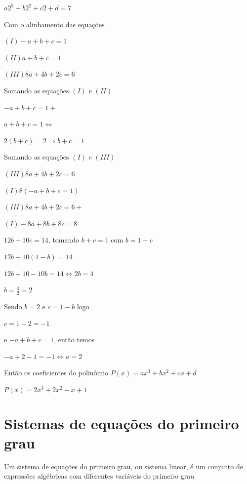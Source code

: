 \begin{multicols*}{2}
\begin{enumerate}
\begin{enumerate}
            $a2^3 + b2^2 + c2 + d = 7$
    
            Com o alinhamento das equações		
            
            $(I) -a +b +c = 1$
            
            $(II) a+b+c = 1$
            
            $(III) 8a + 4b + 2c = 6$
            
            Somando as equações $(I)$ e $(II)$
            
            $-a +b +c = 1 +$
            
            $a +b+ c = 1 \Leftrightarrow$
            
            $2(b+c) = 2 \Rightarrow b+c = 1$
            
            Somando as equações $(I)$ e $(III)$
            
            $(III) 8a +4b + 2c = 6$
                    
            $(I) 8(-a+b+c = 1)$
                    
            $(III) 8a +4b + 2c = 6 +$
                    
            $(I) -8a+8b+8c = 8$
            
            $12b + 10c = 14$, tomando $b+c =1$ com $b = 1 - c$
            
            $12b +10(1-b) = 14$
            
            $12b +10 -10b = 14 \Leftrightarrow 2b = 4$
            
            $b = \frac{4}{2} = 2$
            
            Sendo $b = 2$ e $c = 1 - b$ logo
            
            $c = 1 - 2 = -1$
            
            e $-a+b+c = 1$, então temos
            
            $-a +2 - 1 = -1 \Leftrightarrow a = 2$
            
            Então os coeficientes do polinômio $P(x) = ax^3 + bx^2 + cx + d$ 
            
            $P(x) = 2x^3 +2x^2 -x +1$
            \end{enumerate}
            \end{enumerate}	 
                
             \section*{Sistemas de equações do primeiro grau}
             Um sistema de equações do primeiro grau, ou sistema linear, é um conjunto de expressões 				algébricas com diferentes variáveis do primeiro grau

\end{multicols*}
